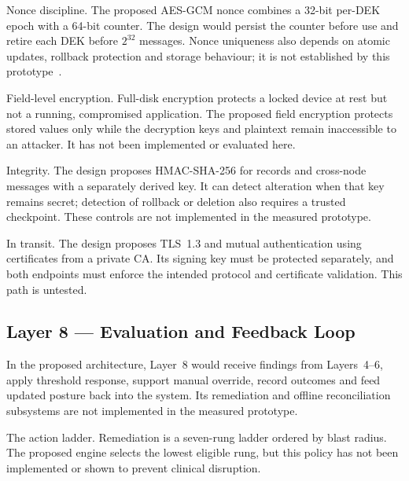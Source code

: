 \documentclass{ieeeaccess}
\renewcommand{\textbf}[1]{#1}
\begin{document}
\noindent\textbf{Nonce discipline.} The proposed AES-GCM nonce combines a 32-bit per-DEK epoch with a 64-bit counter. The design would persist the counter before use and retire each DEK before $2^{32}$ messages. Nonce uniqueness also depends on atomic updates, rollback protection and storage behaviour; it is not established by this prototype~\cite{b_gcm}.

\noindent\textbf{Field-level encryption.} Full-disk encryption protects a locked device at rest but not a running, compromised application. The proposed field encryption protects stored values only while the decryption keys and plaintext remain inaccessible to an attacker. It has not been implemented or evaluated here.

\noindent\textbf{Integrity.} The design proposes HMAC-SHA-256 for records and cross-node messages with a separately derived key. It can detect alteration when that key remains secret; detection of rollback or deletion also requires a trusted checkpoint. These controls are not implemented in the measured prototype.

\noindent\textbf{In transit.} The design proposes TLS~1.3 and mutual authentication using certificates from a private CA. Its signing key must be protected separately, and both endpoints must enforce the intended protocol and certificate validation. This path is untested.

\subsection{Layer 8 --- Evaluation and Feedback Loop}
\label{subsec:layer8}

In the proposed architecture, Layer~8 would receive findings from Layers~4--6, apply threshold response, support manual override, record outcomes and feed updated posture back into the system. Its remediation and offline reconciliation subsystems are not implemented in the measured prototype.

\noindent\textbf{The action ladder.} Remediation is a seven-rung ladder ordered by blast radius. The proposed engine selects the lowest eligible rung, but this policy has not been implemented or shown to prevent clinical disruption.
\end{document}
